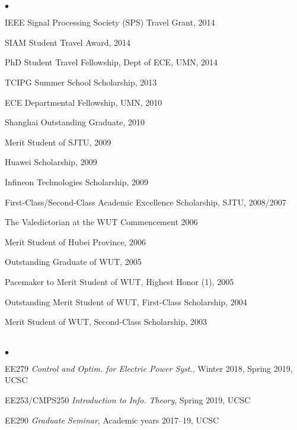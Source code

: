 \documentclass[margin,line]{res}
\newenvironment{list2}{
  \begin{list}{$\bullet$}{%
      \setlength{\itemsep}{0in}
      \setlength{\parsep}{0in} \setlength{\parskip}{0in}
      \setlength{\topsep}{0in} \setlength{\partopsep}{0in}
      \setlength{\leftmargin}{0.10in}}}{\end{list}}
\begin{document}
\begin{resume}
\section{}
\begin{list2}
\item IEEE Signal Processing Society (SPS) Travel Grant, 2014
\item SIAM Student Travel Award, 2014
\item PhD Student Travel Fellowship, Dept of ECE, UMN, 2014	
\item	TCIPG Summer School Scholarship, 2013
\item	ECE Departmental Fellowship, UMN, 2010
\item	Shanghai Outstanding Graduate, 2010
\item	Merit Student of SJTU, 2009
\item	Huawei Scholarship, 2009
\item	Infineon Technologies Scholarship, 2009
\item	First-Class/Second-Class Academic Excellence Scholarship, SJTU, 2008/2007
\item	The Valedictorian at the WUT Commencement 2006
\item	Merit Student of Hubei Province, 2006
\item	Outstanding Graduate of WUT, 2005
\item	Pacemaker to Merit Student of WUT, Highest Honor (1\textperthousand), 2005
\item	Outstanding Merit Student of WUT, First-Class Scholarship, 2004
\item	Merit Student of WUT, Second-Class Scholarship, 2003
\end{list2}

\vspace{.3cm}


\section{}

\begin{list2}
\item EE279 \emph{Control and Optim. for Electric Power Syst.}, Winter 2018, Spring 2019, UCSC
\item EE253/CMPS250 \emph{Introduction to Info. Theory}, Spring 2019, UCSC
\item EE290 \emph{Graduate Seminar}, Academic years 2017--19, UCSC
\end{list2}


\end{resume}
\end{document}
